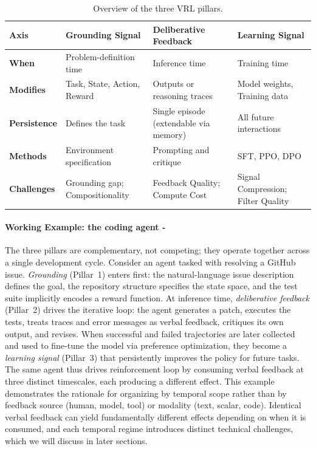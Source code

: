 \begin{table}[ht]
    \centering
    \small
    \renewcommand{\arraystretch}{1.2}
    \caption{Overview of the three VRL pillars.}
    \label{tab:pillar-overview}
    \begin{tabularx}{\linewidth}{@{} l *{3}{>{\raggedright\arraybackslash}X} @{}}
        \toprule
        \textbf{Axis} & \textbf{Grounding Signal} & \textbf{Deliberative Feedback} & \textbf{Learning Signal} \\
        \midrule
        \textbf{When} & Problem-definition time & Inference time & Training time \\
        \midrule
        \textbf{Modifies} & Task, State, Action, Reward & Outputs or reasoning traces & Model weights, Training data \\
        \midrule
        \textbf{Persistence} & Defines the task & Single episode (extendable via memory) & All future interactions \\
        \midrule
        \textbf{Methods} & Environment specification & Prompting and critique & SFT, PPO, DPO \\
        \midrule
        \textbf{Challenges} & Grounding gap; Compositionality & Feedback Quality; Compute Cost & Signal Compression; Filter Quality \\
        \bottomrule
    \end{tabularx}
\end{table}


\paragraph{Working Example: the coding agent - }
The three pillars are complementary, not competing; they operate together across a single development cycle. Consider an agent \citep{wang2025openhands} tasked with resolving a GitHub issue. \emph{Grounding} (Pillar~1) enters first: the natural-language issue description defines the goal, the repository structure specifies the state space, and the test suite implicitly encodes a reward function. At inference time, \emph{deliberative feedback} (Pillar~2) drives the iterative loop: the agent generates a patch, executes the tests, treats traces and error messages as verbal feedback, critiques its own output, and revises. When successful and failed trajectories are later collected and used to fine-tune the model via preference optimization, they become a \emph{learning signal} (Pillar~3) that persistently improves the policy for future tasks. The same agent thus drives reinforcement loop by consuming verbal feedback at three distinct timescales, each producing a different effect. This example demonstrates the rationale for organizing by temporal scope rather than by feedback source (human, model, tool) or modality (text, scalar, code). Identical verbal feedback can yield fundamentally different effects depending on when it is consumed, and each temporal regime introduces distinct technical challenges, which we will discuss in later sections. 
 
